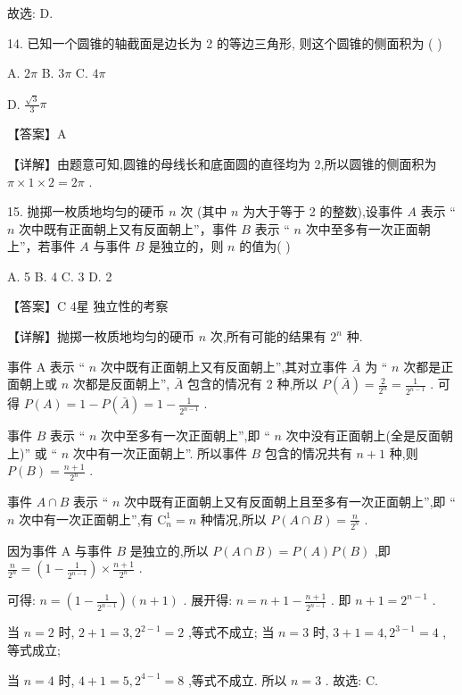 \documentclass[10pt]{article}
\begin{document}
故选: D.

14. 已知一个圆锥的轴截面是边长为 2 的等边三角形, 则这个圆锥的侧面积为 ( )

A. \({2\pi }\) B. \({3\pi }\) C. \({4\pi }\)

D. \(\frac{\sqrt{3}}{3}\pi\)

【答案】A

【详解】由题意可知,圆锥的母线长和底面圆的直径均为 2,所以圆锥的侧面积为 \(\pi  \times  1 \times  2 = {2\pi }\) .

15. 抛掷一枚质地均匀的硬币 \(n\) 次 (其中 \(n\) 为大于等于 2 的整数),设事件 \(A\) 表示 “ \(n\) 次中既有正面朝上又有反面朝上”，事件 \(B\) 表示 “ \(n\) 次中至多有一次正面朝上”，若事件 \(A\) 与事件 \(B\) 是独立的，则 \(n\) 的值为( )

A. 5 B. 4 C. 3 D. 2

【答案】C 4星 独立性的考察

【详解】抛掷一枚质地均匀的硬币 \(n\) 次,所有可能的结果有 \({2}^{n}\) 种.

事件 A 表示 “ \(n\) 次中既有正面朝上又有反面朝上”,其对立事件 \(\bar{A}\) 为 “ \(n\) 次都是正面朝上或 \(n\) 次都是反面朝上”, \(\bar{A}\) 包含的情况有 2 种,所以 \(P\left( \bar{A}\right)  = \frac{2}{{2}^{n}} = \frac{1}{{2}^{n - 1}}\) . 可得 \(P\left( A\right)  = 1 - P\left( \bar{A}\right)  = 1 - \frac{1}{{2}^{n - 1}}\) .

事件 \(B\) 表示 “ \(n\) 次中至多有一次正面朝上”,即 “ \(n\) 次中没有正面朝上(全是反面朝上)” 或 “ \(n\) 次中有一次正面朝上”. 所以事件 \(B\) 包含的情况共有 \(n + 1\) 种,则 \(P\left( B\right)  = \frac{n + 1}{{2}^{n}}\) .

事件 \(A \cap  B\) 表示 “ \(n\) 次中既有正面朝上又有反面朝上且至多有一次正面朝上”,即 “ \(n\) 次中有一次正面朝上”,有 \({\mathrm{C}}_{n}^{1} = n\) 种情况,所以 \(P\left( {A \cap  B}\right)  = \frac{n}{{2}^{n}}\) .

因为事件 \(\mathrm{A}\) 与事件 \(B\) 是独立的,所以 \(P\left( {A \cap  B}\right)  = P\left( A\right) P\left( B\right)\) ,即 \(\frac{n}{{2}^{n}} = \left( {1 - \frac{1}{{2}^{n - 1}}}\right)  \times  \frac{n + 1}{{2}^{n}}\) .

可得: \(n = \left( {1 - \frac{1}{{2}^{n - 1}}}\right) \left( {n + 1}\right)\) . 展开得: \(n = n + 1 - \frac{n + 1}{{2}^{n - 1}}\) . 即 \(n + 1 = {2}^{n - 1}\) .

当 \(n = 2\) 时, \(2 + 1 = 3,{2}^{2 - 1} = 2\) ,等式不成立; 当 \(n = 3\) 时, \(3 + 1 = 4,{2}^{3 - 1} = 4\) ,等式成立;

当 \(n = 4\) 时, \(4 + 1 = 5,{2}^{4 - 1} = 8\) ,等式不成立. 所以 \(n = 3\) . 故选: C.
\end{document}
